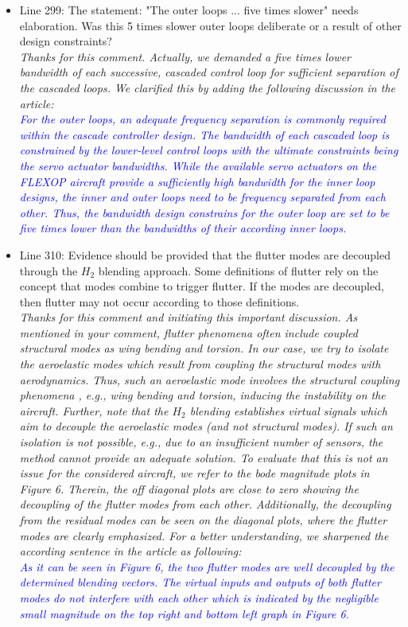 \documentclass{article}
\begin{document}
\begin{itemize}
	\item Line 299: The statement: "The outer loops ... five times slower"  needs elaboration.  Was this 5 times slower outer loops deliberate or a result of other design constraints? \\
	\textit{Thanks for this comment. Actually, we demanded a five times lower bandwidth of each successive, cascaded control loop for sufficient separation of the cascaded loops. We clarified this by adding the following discussion in the article:}\\
	\textit{\textcolor{blue}{
	For the outer loops, an adequate frequency separation is commonly required within the cascade controller design.
	The bandwidth of each cascaded loop is constrained by the lower-level control loops with the ultimate constraints being the servo actuator bandwidths.  While the available servo actuators on the FLEXOP aircraft provide a sufficiently high bandwidth for the inner loop designs, the inner  and outer loops need to be frequency separated from each other. Thus, the bandwidth design constrains for the outer loop are set to be five times lower than the bandwidths of their according inner loops.}}
	

	\item Line 310: Evidence should be provided that the flutter modes are decoupled through the $H_2$ blending approach.  Some definitions of flutter rely on the concept that modes combine to trigger flutter.  If the modes are decoupled, then flutter may not occur according to those definitions.\\
	\textit{Thanks for this comment and initiating this important discussion. As mentioned in your comment, flutter phenomena often include coupled \textnormal{structural} modes as wing bending and torsion. In our case, we try to isolate the \textnormal{aeroelastic} modes which result from coupling the structural modes with aerodynamics. Thus, such an aeroelastic mode involves the structural coupling phenomena , e.g., wing bending and torsion, inducing the instability on the aircraft. Further, note that the $H_2$ blending establishes virtual signals which aim to decouple the aeroelastic modes (and not structural modes). If such an isolation is not possible, e.g., due to an insufficient number of sensors, the method cannot  provide an adequate solution. To evaluate that this is not an issue for the considered aircraft, we refer to the bode magnitude plots in Figure 6. Therein, the off diagonal plots are close to zero showing the decoupling of the flutter modes from each other. Additionally, the decoupling from the residual modes can be seen on the diagonal plots, where the flutter modes are clearly emphasized. For a better understanding, we sharpened the according sentence in the article as following:}\\
	\textit{\textcolor{blue}{
	As it can be seen in Figure 6, the two flutter modes are well decoupled by the determined blending vectors. The virtual inputs and outputs of both flutter modes do not interfere with each other which is indicated by the negligible small magnitude on the top right and bottom left graph in Figure 6.}}
	

\end{itemize}
\end{document}
